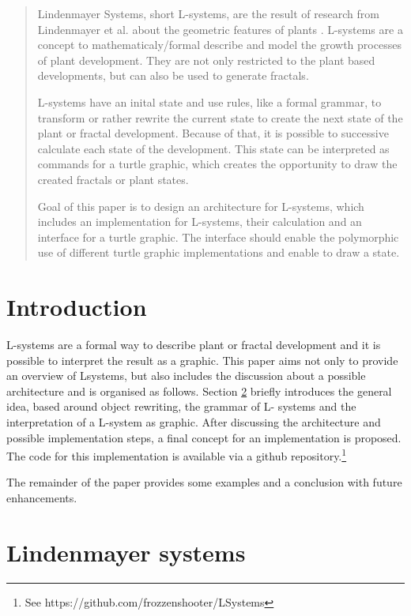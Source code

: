 \documentclass[english]{cpp-hmwk}
\begin{document}

\begin{abstract}
Lindenmayer Systems, short L-systems, are the result of research from Lindenmayer et al. about the geometric features of plants \cite{prusinkiewiczp.lindenmayera.2004}.
L-systems are a concept to mathematicaly/formal describe and model the growth processes of plant development. They are not only restricted to the plant based developments, but can also be used to generate fractals.

L-systems have an inital state and use rules, like a formal grammar, to transform or rather rewrite the current state to create the next state of the plant or fractal development.
Because of that, it is possible to successive calculate each state of the development.
This state can be interpreted as commands for a turtle graphic, which creates the opportunity to draw the created fractals or plant states. 

Goal of this paper is to design an architecture for L-systems, which includes an implementation for L-systems, their calculation and an interface for a turtle graphic. The interface should enable the polymorphic use of different turtle graphic implementations and enable to draw a state.
\end{abstract}

\pagebreak
\section{Introduction}
L-systems are a formal way to describe plant or fractal development and it is possible to interpret the result as a graphic. This paper aims not only to provide an overview of Lsystems, but also includes the discussion about a possible architecture and is organised as follows. Section \ref{section:lindenmayer} briefly introduces the general idea, based around object rewriting, the grammar of L- systems and the interpretation of a L-system as graphic.
After discussing the architecture and possible implementation steps, a final concept for an implementation is proposed. The code for this implementation is available via a github repository.\footnote{See https://github.com/frozzenshooter/LSystems}

The remainder of the paper provides some examples and a conclusion with future enhancements.

\section{Lindenmayer systems}
\label{section:lindenmayer}
\end{document}
